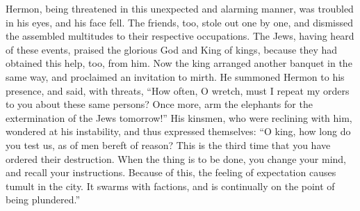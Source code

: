  Hermon, being threatened in this unexpected and alarming
manner, was troubled in his eyes, and his face fell.  The
friends, too, stole out one by one, and dismissed the assembled
multitudes to their respective occupations.  The Jews,
having heard of these events, praised the glorious God and King of
kings, because they had obtained this help, too, from him. 
Now the king arranged another banquet in the same way, and proclaimed an
invitation to mirth.  He summoned Hermon to his presence,
and said, with threats, ``How often, O wretch, must I repeat my orders
to you about these same persons?  Once more, arm the
elephants for the extermination of the Jews tomorrow!'' 
His kinsmen, who were reclining with him, wondered at his instability,
and thus expressed themselves:  ``O king, how long do you
test us, as of men bereft of reason? This is the third time that you
have ordered their destruction. When the thing is to be done, you change
your mind, and recall your instructions.  Because of this,
the feeling of expectation causes tumult in the city. It swarms with
factions, and is continually on the point of being plundered.''

